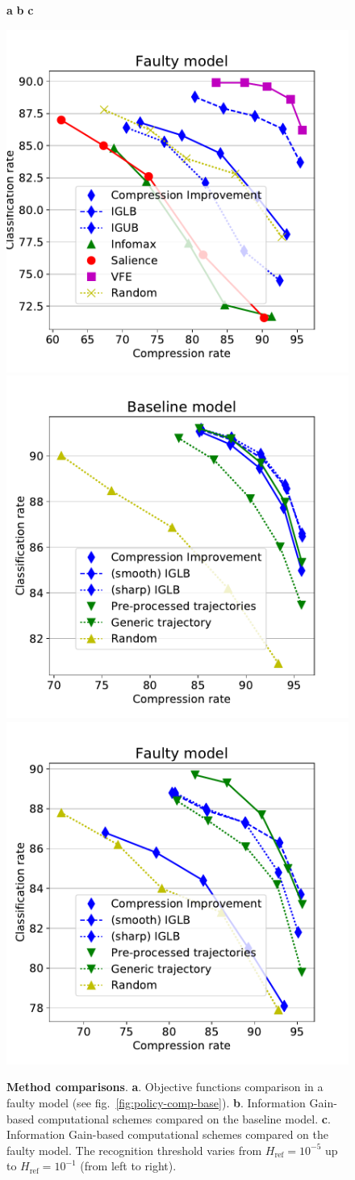 \documentclass[12pt,twoside,openright]{article}
\begin{document}
\begin{figure}
	\centerline{{\bf a} \hspace{5.6cm} {\bf b}\hspace{5.6cm} {\bf c}}
	\centerline{
		\includegraphics[width = .33\linewidth]{img/frontiers-classif-faulty.pdf} 
		\includegraphics[width = .33\linewidth]{img/frontiers-classif-base-scaleup.pdf} 
		\includegraphics[width = .33\linewidth]{img/frontiers-classif-faulty-scaleup.pdf} 
			}
	\vspace{-.2cm}
	\caption{\textbf{Method comparisons}. \textbf{a}. Objective functions  comparison in a faulty model (see  fig.~\ref{fig:policy-comp-base}).  \textbf{b}. Information Gain-based computational schemes compared on the baseline model. \textbf{c}. Information Gain-based computational schemes compared on the faulty model. The recognition threshold varies from $H_\text{ref}=10^{-5}$ up to  $H_\text{ref}=10^{-1}$ (from left to right).}\label{fig:failed}
\end{figure}
\end{document}
